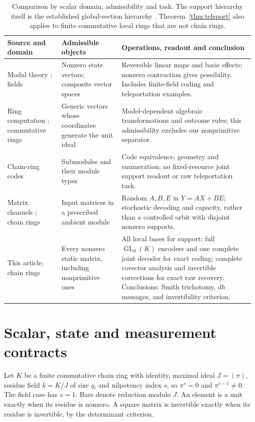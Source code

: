 \documentclass[11pt]{article}
\theoremstyle{definition}\newtheorem{definition}[theorem]{Definition}
\theoremstyle{remark}\newtheorem{remark}[theorem]{Remark}
\DeclareMathOperator{\GL}{GL}
\begin{document}
\begin{table}[ht]\centering\small
\begin{tabular}{>{\raggedright\arraybackslash}p{.19\linewidth}>{\raggedright\arraybackslash}p{.25\linewidth}>{\raggedright\arraybackslash}p{.43\linewidth}}
\toprule
Source and domain & Admissible objects & Operations, readout and conclusion\\\midrule
Modal theory \cite{Schumacher2010,Schumacher2012}; fields & Nonzero state vectors; composite vector spaces & Reversible linear maps and basis effects; nonzero contraction gives possibility. Includes finite-field coding and teleportation examples.\\[3pt]
Ring computation \cite{deBeaudrap2014}; commutative rings & Generic vectors whose coordinates generate the unit ideal & Model-dependent algebraic transformations and outcome rules; this admissibility excludes our nonprimitive separator.\\[3pt]
Chain-ring codes \cite{HonoldLandjev2000,Byrne2021} & Submodules and their module types & Code equivalence, geometry and enumeration; no fixed-resource joint support readout or raw teleportation task.\\[3pt]
Matrix channels \cite{Feng2014}; chain rings & Input matrices in a prescribed ambient module & Random $A,B,E$ in $Y=AX+BE$; stochastic decoding and capacity, rather than a controlled orbit with disjoint nonzero supports.\\[3pt]
This article; chain rings & Every nonzero static matrix, including nonprimitive ones & All local bases for support; full $\GL_d(K)$ encoders and one complete joint decoder for exact coding; complete covector analysis and invertible corrections for exact raw recovery. Conclusions: Smith trichotomy, $dh$ messages, and invertibility criterion.\\
\bottomrule
\end{tabular}
\caption{Comparison by scalar domain, admissibility and task. The support hierarchy itself is the established global-section hierarchy \cite{AbramskyBrandenburger2011}. Theorem~\ref{thm:teleport} also applies to finite commutative local rings that are not chain rings.}\label{tab:prior}
\end{table}

\FloatBarrier
\section{Scalar, state and measurement contracts}\label{sec:contract}
Let $K$ be a finite commutative chain ring with identity, maximal ideal $J=(\pi)$, residue field $k=K/J$ of size $q$, and nilpotency index $s$, so $\pi^s=0$ and $\pi^{s-1}\ne0$. The field case has $s=1$. Bars denote reduction modulo $J$. An element is a unit exactly when its residue is nonzero. A square matrix is invertible exactly when its residue is invertible, by the determinant criterion.
\end{document}
